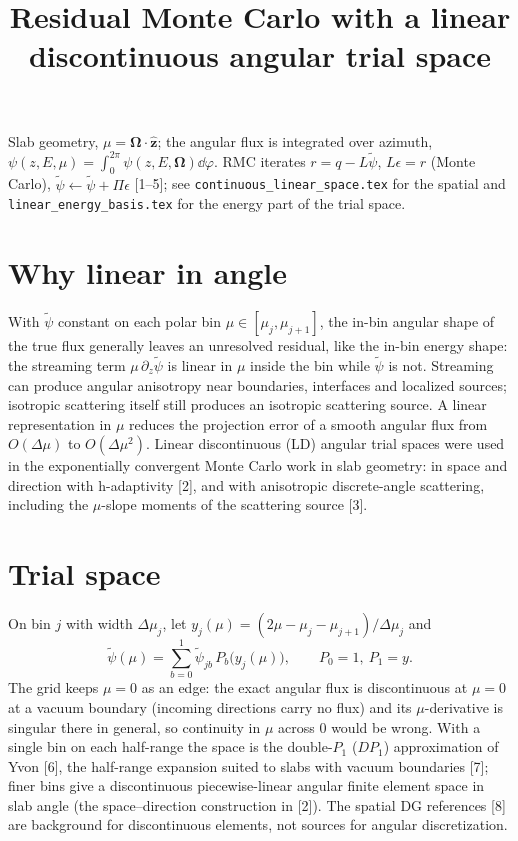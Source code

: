 \documentclass[11pt]{article}
\title{Residual Monte Carlo with a linear discontinuous angular trial space}
\date{}
\newcommand{\tpsi}{\tilde\psi}
\begin{document}
\maketitle

\noindent Slab geometry, $\mu=\boldsymbol\Omega\cdot\hat{\mathbf z}$; the angular flux is
integrated over azimuth, $\psi(z,E,\mu)=\int_0^{2\pi}\psi(z,E,\boldsymbol\Omega)\dd\varphi$.
RMC iterates $r=q-L\tpsi$, $L\epsilon=r$ (Monte Carlo), $\tpsi\leftarrow\tpsi+\Pi\epsilon$
[1--5]; see \texttt{continuous\_linear\_space.tex} for the spatial and
\texttt{linear\_energy\_basis.tex} for the energy part of the trial space.

\section{Why linear in angle}

With $\tpsi$ constant on each polar bin $\mu\in[\mu_j,\mu_{j+1}]$, the in-bin angular
shape of the true flux generally leaves an unresolved residual, like the in-bin
energy shape: the streaming term $\mu\,\partial_z\tpsi$ is linear in $\mu$ inside the
bin while $\tpsi$ is not. Streaming can produce angular anisotropy near boundaries,
interfaces and localized sources; isotropic scattering itself still produces an
isotropic scattering source. A linear representation
in $\mu$ reduces the projection error of a smooth angular flux from $O(\Delta\mu)$ to
$O(\Delta\mu^2)$. Linear discontinuous (LD) angular trial spaces were used in the
exponentially convergent Monte Carlo work in slab geometry: in space and direction with
h-adaptivity [2], and with anisotropic discrete-angle scattering, including the
$\mu$-slope moments of the scattering source [3].

\section{Trial space}

On bin $j$ with width $\Delta\mu_j$, let $y_j(\mu)=(2\mu-\mu_j-\mu_{j+1})/\Delta\mu_j$
and
\begin{equation}
  \tpsi(\mu) = \sum_{b=0}^{1}\tpsi_{jb}\,P_b\big(y_j(\mu)\big),\qquad P_0=1,\ P_1=y .
\end{equation}
The grid keeps $\mu=0$ as an edge: the exact angular flux is discontinuous at $\mu=0$ at
a vacuum boundary (incoming directions carry no flux) and its $\mu$-derivative is
singular there in general, so continuity in $\mu$ across $0$ would be wrong. With a
single bin on each half-range the space is the double-$P_1$ ($DP_1$) approximation of
Yvon [6], the half-range expansion suited to slabs with vacuum boundaries [7]; finer
bins give a discontinuous piecewise-linear angular finite element space in slab
angle (the space--direction construction in [2]). The spatial DG references [8]
are background for discontinuous elements, not sources for angular discretization.
\end{document}
